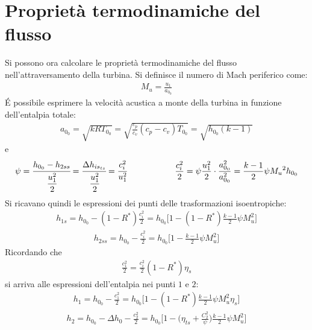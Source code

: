 \section{Proprietà termodinamiche del flusso}
Si possono ora calcolare le proprietà termodinamiche del flusso nell'attraversamento della turbina. Si definisce il numero di Mach periferico come:
\begin{align*}
M_u = \frac{u_1}{a_{0_0}}
\end{align*}
\'E possibile esprimere la velocità acustica a monte della turbina in funzione dell'entalpia totale:
\begin{align*}
a_{0_0} = \sqrt{kRT_{0_0}} = \sqrt{\frac{c_p}{c_v} \left( c_p - c_v \right) T_{0_0}} = \sqrt{h_{0_0} \left( k - 1 \right)}
\end{align*}
e
\begin{align*}
\psi = \cfrac{h_{0_0} - h_{2ss}}{\cfrac{u_1^2}{2}} = \cfrac{\Delta h_{is_{ts}}}{\cfrac{u_1^2}{2}} = \cfrac{c_i^2}{u_1^2} \hspace{2cm} \frac{c_i^2}{2} = \psi \frac{u_1^2}{2} \cdot \frac{a_{0_0}^2}{a_{0_0}^2} = \frac{k-1}{2}\psi {M_u}^2 h_{0_0}
\end{align*}
Si ricavano quindi le espressioni dei punti delle trasformazioni isoentropiche:
\begin{align*}
h_{1s} = h_{0_0} - \left(1- R^* \right) \frac{c_i^2}{2} = h_{0_0} \bigg[ 1- \left( 1- R^* \right) \frac{k-1}{2} \psi M_u^2 \bigg]
\end{align*}
\begin{align*}
h_{2ss} = h_{0_0} - \frac{c_i^2}{2} = h_{0_0} \bigg[ 1 - \frac{k-1}{2} \psi M_u^2 \bigg]
\end{align*}
Ricordando che
\begin{align*}
\frac{c_1^2}{2} = \frac{c_i^2}{2} \left( 1- R^* \right) \eta_s
\end{align*}
si arriva alle espressioni dell'entalpia nei punti $1$ e $2$:
\begin{align*}
\boxed{h_1 = h_{0_0} - \frac{c_1^2}{2} = h_{0_0} \bigg[ 1- \left( 1- R^* \right) \frac{k-1}{2}  \psi M_u^2 \eta_s\bigg]}
\end{align*}
\begin{align*}
\boxed{h_2 = h_{0_0} - \Delta h_0 - \frac{c_2^2}{2} = h_{0_0} \bigg[ 1- \bigg( \eta_{ts} + \frac{C_2^2}{\psi} \bigg) \frac{k-1}{2} \psi M_u^2 \bigg]}
\end{align*}


